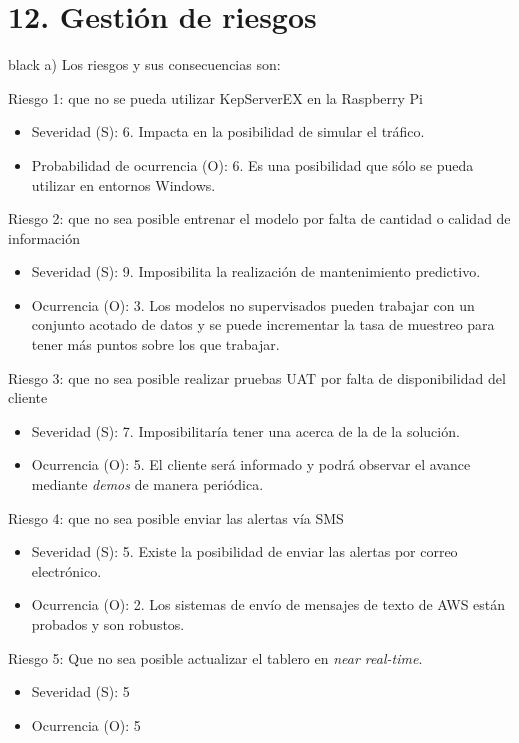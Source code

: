\documentclass[11pt]{charter}
\begin{document}
\section{12. Gestión de riesgos}
\label{sec:riesgos}

\begin{consigna}{black}
a) Los riesgos y sus consecuencias son:
 
Riesgo 1: que no se pueda utilizar KepServerEX en la Raspberry Pi
\begin{itemize}
\item Severidad (S): 6. Impacta en la posibilidad de simular el tráfico.
\item Probabilidad de ocurrencia (O): 6. Es una posibilidad que sólo se pueda utilizar en entornos Windows.

\end{itemize}   

Riesgo 2: que no sea posible entrenar el modelo por falta de cantidad o calidad de información
\begin{itemize}
\item Severidad (S): 9. Imposibilita la realización de mantenimiento predictivo.
\item Ocurrencia (O): 3. Los modelos no supervisados pueden trabajar con un conjunto acotado de datos y se puede incrementar la tasa de muestreo para tener más puntos sobre los que trabajar.
\end{itemize}

Riesgo 3: que no sea posible realizar pruebas UAT por falta de disponibilidad del cliente
\begin{itemize}
\item Severidad (S): 7. Imposibilitaría tener una acerca de la de la solución.
\item Ocurrencia (O): 5. El cliente será informado y podrá observar el avance mediante \textit{demos} de manera periódica.
\end{itemize}

Riesgo 4: que no sea posible enviar las alertas vía SMS
\begin{itemize}
\item Severidad (S): 5. Existe la posibilidad de enviar las alertas por correo electrónico.
\item Ocurrencia (O): 2. Los sistemas de envío de mensajes de texto de AWS están probados y son robustos.
\end{itemize}

Riesgo 5: Que no sea posible actualizar el tablero en \textit{near real-time}.
\begin{itemize}
\item Severidad (S): 5
\item Ocurrencia (O): 5
\end{itemize}


\end{consigna}
\end{document}
